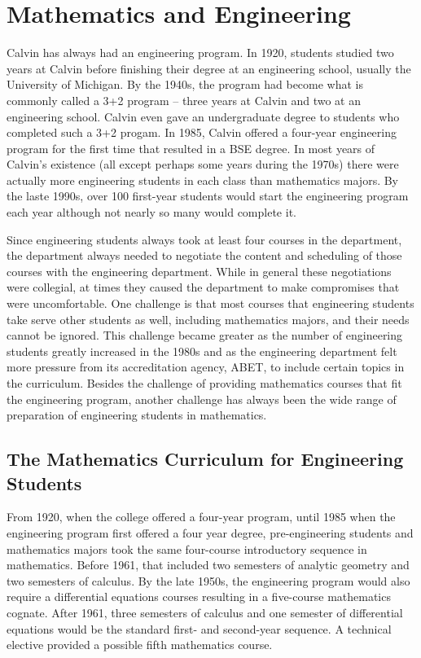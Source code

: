 \documentclass[
]{book}
\begin{document}
\hypertarget{mathematics-and-engineering}{%
\chapter{Mathematics and Engineering}\label{mathematics-and-engineering}}

Calvin has always had an engineering program. In 1920, students studied two years at Calvin before finishing their degree at an engineering school, usually the University of Michigan. By the 1940s, the program had become what is commonly called a 3+2 program -- three years at Calvin and two at an engineering school. Calvin even gave an undergraduate degree to students who completed such a 3+2 progam. In 1985, Calvin offered a four-year engineering program for the first time that resulted in a BSE degree. In most years of Calvin's existence (all except perhaps some years during the 1970s) there were actually more engineering students in each class than mathematics majors. By the laste 1990s, over 100 first-year students would start the engineering program each year although not nearly so many would complete it.

Since engineering students always took at least four courses in the department, the department always needed to negotiate the content and scheduling of those courses with the engineering department. While in general these negotiations were collegial, at times they caused the department to make compromises that were uncomfortable. One challenge is that most courses that engineering students take serve other students as well, including mathematics majors, and their needs cannot be ignored. This challenge became greater as the number of engineering students greatly increased in the 1980s and as the engineering department felt more pressure from its accreditation agency, ABET, to include certain topics in the curriculum.
Besides the challenge of providing mathematics courses that fit the engineering program, another challenge has always been the wide range of preparation of engineering students in mathematics.

\hypertarget{the-mathematics-curriculum-for-engineering-students}{%
\section{The Mathematics Curriculum for Engineering Students}\label{the-mathematics-curriculum-for-engineering-students}}

From 1920, when the college offered a four-year program, until 1985 when the engineering program first offered a four year degree, pre-engineering students and mathematics majors took the same four-course introductory sequence in mathematics. Before 1961, that included two semesters of analytic geometry and two semesters of calculus. By the late 1950s, the engineering program would also require a differential equations courses resulting in a five-course mathematics cognate. After 1961, three semesters of calculus and one semester of differential equations would be the standard first- and second-year sequence. A technical elective provided a possible fifth mathematics course.
\end{document}
